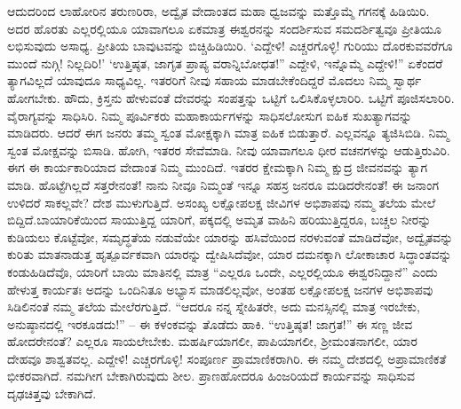 ಆದುದರಿಂದ ಲಾಹೋರಿನ ತರುಣರಿರಾ, ಅದ್ವೈತ ವೇದಾಂತದ ಮಹಾ ಧ್ವಜವನ್ನು ಮತ್ತೊಮ್ಮೆ ಗಗನಕ್ಕೆ ಹಿಡಿಯಿರಿ. ಅದರ ಹೊರತು ಎಲ್ಲರಲ್ಲಿಯೂ ಯಾವಾಗಲೂ ಏಕಮಾತ್ರ ಈಶ್ವರನನ್ನು ಸಂದರ್ಶಿಸುವ ಸಮದರ್ಶಿತ್ವವೂ ಪ್ರೀತಿಯೂ ಲಭಿಸುವುದು ಅಸಾಧ್ಯ. ಪ್ರೀತಿಯ ಬಾವುಟವನ್ನು ಬಿಚ್ಚಿಹಿಡಿಯಿರಿ. ‘ಎದ್ದೇಳಿ! ಎಚ್ಚರಗೊಳ್ಳಿ! ಗುರಿಯು ದೊರಕುವವರೆಗೂ ಮುಂದೆ ನುಗ್ಗಿ! ನಿಲ್ಲದಿರಿ!’ ‘ಉತ್ತಿಷ್ಠತ, ಜಾಗೃತ ಪ್ರಾಪ್ಯ ವರಾನ್ನಿಬೋಧತ!” ಎದ್ದೇಳಿ, ಇನ್ನೊಮ್ಮೆ ಎದ್ದೇಳಿ!” ಏಕೆಂದರೆ ತ್ಯಾಗವಿಲ್ಲದೆ ಯಾವುದೂ ಸಾಧ್ಯವಿಲ್ಲ. ಇತರರಿಗೆ ನೀವು ಸಹಾಯ ಮಾಡಬೇಕೆಂದಿದ್ದರೆ ಮೊದಲು ನಿಮ್ಮ ಸ್ವಾರ್ಥ ಹೋಗಬೇಕು. ಹೌದು, ಕ್ರಿಸ್ತನು ಹೇಳುವಂತೆ ದೇವರನ್ನು ಸಂಪತ್ತನ್ನು ಒಟ್ಟಿಗೆ ಒಲಿಸಿಕೊಳ್ಳಲಾರಿರಿ. ಒಟ್ಟಿಗೆ ಪೂಜಿಸಲಾರಿರಿ. ವೈರಾಗ್ಯವನ್ನು ಸಾಧಿಸಿರಿ. ನಿಮ್ಮ ಪೂರ್ವಿಕರು ಮಹಾಕಾರ್ಯಗಳನ್ನು ಸಾಧಿಸಲೋಸುಗ ಐಹಿಕ ಸುಖತ್ಯಾಗವನ್ನು ಮಾಡಿದರು. ಆದರೆ ಈಗ ಜನರು ತಮ್ಮ ಸ್ವಂತ ಮೋಕ್ಷಕ್ಕಾಗಿ ಮಾತ್ರ ಐಹಿಕ ಬಿಡುತ್ತಾರೆ. ಎಲ್ಲವನ್ನೂ ತ್ಯಜಿಸಿಬಿಡಿ. ನಿಮ್ಮ ಸ್ವಂತ ಮೋಕ್ಷವನ್ನು ಬಿಸಾಡಿ. ಹೋಗಿ, ಇತರರ ಸೇವೆಮಾಡಿ. ನೀವು ಯಾವಾಗಲೂ ಧೀರ ವಚನಗಳನ್ನು ಆಡುತ್ತಿರುವಿರಿ. ಈಗ ಈ ಕಾರ್ಯಕಾರಿಯಾದ ವೇದಾಂತ ನಿಮ್ಮ ಮುಂದಿದೆ. ಇತರರ ಕ್ಷೇಮಕ್ಕಾಗಿ ನಿಮ್ಮ ಕ್ಷುದ್ರ ಜೀವನವನ್ನು ತ್ಯಾಗ ಮಾಡಿ. ಹೊಟ್ಟೆಗಿಲ್ಲದೆ ಸತ್ತರೇನಂತೆ! ನಾನು ನೀವೂ ನಿಮ್ಮಂತೆ ಇನ್ನೂ ಸಹಸ್ರ ಜನರೂ ಮಡಿದರೇನಂತೆ! ಈ ಜನಾಂಗ ಉಳಿದರೆ ಸಾಕಲ್ಲವೇ? ದೇಶ ಮುಳುಗುತ್ತಿದೆ. ಅಸಂಖ್ಯ ಲಕ್ಷೋಪಲಕ್ಷ ಜೀವಿಗಳ ಅಭಿಶಾಪವು ನಮ್ಮ ತಲೆಯ ಮೇಲೆ ಬಿದ್ದಿದೆ.\break ಬಾಯಾರಿಕೆಯಿಂದ ಸಾಯುತ್ತಿದ್ದ ಯಾರಿಗೆ, ಪಕ್ಕದಲ್ಲಿ ಅಮೃತ ವಾಹಿನಿ ಹರಿಯುತ್ತಿದ್ದರೂ, ಬಚ್ಚಲ ನೀರನ್ನು ಕುಡಿಯಲು ಕೊಟ್ಟೆವೋ, ಸಮೃದ್ಧತೆಯ ನಡುವೆಯೇ ಯಾರನ್ನು ಹಸಿವೆಯಿಂದ ನರಳುವಂತೆ ಮಾಡಿದೆವೋ, ಅದ್ವೈತವನ್ನು ಕುರಿತು ಮಾತನಾಡುತ್ತ ಹೃತ್ಪೂರ್ವಕವಾಗಿ ಯಾರನ್ನು ದ್ವೇಷಿಸಿದೆವೋ, ಯಾರ ದಮನಕ್ಕಾಗಿ ಲೋಕಾಚಾರ ಸಿದ್ಧಾಂತವನ್ನು ಕಂಡುಹಿಡಿದೆವೊ, ಯಾರಿಗೆ ಬಾಯಿ ಮಾತಿನಲ್ಲಿ ಮಾತ್ರ “ಎಲ್ಲರೂ ಒಂದೇ, ಎಲ್ಲರಲ್ಲಿಯೂ ಈಶ್ವರನಿದ್ದಾನೆ” ಎಂದು ಹೇಳುತ್ತ ಕಾರ್ಯತಃ ಅದನ್ನು ಒಂದಿನಿತೂ ಅಭ್ಯಾಸ ಮಾಡಲಿಲ್ಲವೋ, ಅಂತಹ ಲಕ್ಷೋಪಲಕ್ಷ ಜನಗಳ ಅಭಿಶಾಪವು ಸಿಡಿಲಿನಂತೆ ನಮ್ಮ ತಲೆಯ ಮೇಲೆರಗುತ್ತಿದೆ. “ಆದರೂ ನನ್ನ ಸ್ನೇಹಿತರೇ, ಅದು ಮನಸ್ಸಿನಲ್ಲಿ ಮಾತ್ರ ಇರಬೇಕು, ಅನುಷ್ಠಾನದಲ್ಲಿ ಇರಕೂಡದು!” – ಈ ಕಳಂಕವನ್ನು ತೊಡೆದು ಹಾಕಿ. “ಉತ್ತಿಷ್ಠತ! ಜಾಗ್ರತ!” ಈ ಸಣ್ಣ ಜೀವ ಹೋದರೇನಂತೆ? ಎಲ್ಲರೂ ಸಾಯಲೇಬೇಕು. ಮಹರ್ಷಿಯಾಗಲೀ, ಪಾಪಿಯಾಗಲೀ, ಶ‍್ರೀಮಂತನಾಗಲೀ, ಯಾರ ದೇಹವೂ ಶಾಶ್ವತವಲ್ಲ. ಎದ್ದೇಳಿ! ಎಚ್ಚರಗೊಳ್ಳಿ! ಸಂಪೂರ್ಣ ಪ್ರಾಮಾಣಿಕರಾಗಿರಿ. ಈ ನಮ್ಮ ದೇಶದಲ್ಲಿ ಅಪ್ರಾಮಾಣಿಕತೆ ಭೀಕರವಾಗಿದೆ. ನಮಗೀಗ ಬೇಕಾಗಿರುವುದು ಶೀಲ. ಪ್ರಾಣಹೋದರೂ ಹಿಂಜರಿಯದೆ ಕಾರ್ಯವನ್ನು ಸಾಧಿಸುವ ದೃಢಚಿತ್ತವು ಬೇಕಾಗಿದೆ. 


